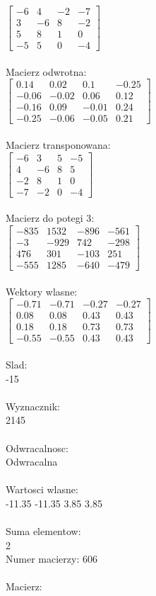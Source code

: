 \documentclass[a4paper,12pt]{article}
\begin{document}
$\begin{bmatrix} -6&4&-2&-7\\3&-6&8&-2\\5&8&1&0\\-5&5&0&-4 \end{bmatrix}$
\\
\\
Macierz odwrotna:\\

$\begin{bmatrix} 0.14&0.02&0.1&-0.25\\-0.06&-0.02&0.06&0.12\\-0.16&0.09&-0.01&0.24\\-0.25&-0.06&-0.05&0.21 \end{bmatrix}$
\\
\\
Macierz transponowana:\\

$\begin{bmatrix} -6&3&5&-5\\4&-6&8&5\\-2&8&1&0\\-7&-2&0&-4 \end{bmatrix}$
\\
\\
Macierz do potegi 3:\\

$\begin{bmatrix} -835&1532&-896&-561\\-3&-929&742&-298\\476&301&-103&251\\-555&1285&-640&-479 \end{bmatrix}$
\\
\\
Wektory wlasne:\\

$\begin{bmatrix} -0.71&-0.71&-0.27&-0.27\\0.08&0.08&0.43&0.43\\0.18&0.18&0.73&0.73\\-0.55&-0.55&0.43&0.43 \end{bmatrix}$
\\
\\
Slad:\\
-15
\\
\\
Wyznacznik:\\
2145
\\
\\
Odwracalnosc:\\
Odwracalna
\\
\\
Wartosci wlasne:\\
-11.35 -11.35 3.85 3.85
\\
\\
Suma elementow:\\
2
\\
\newpage
Numer macierzy:
606
\\
\\
Macierz:\\
\end{document}
